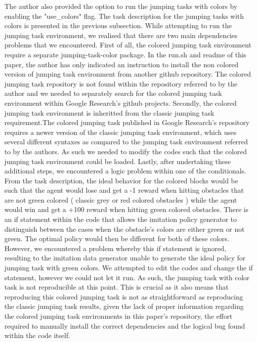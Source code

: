 \documentclass{usiinftr}
\begin{document}
The author also provided the option to run the jumping tasks with colors by enabling the "use\_colors" flag. The task description for the jumping tasks with colors is presented in the previous subsection. While attempting to run the jumping task environment, we realised that there are two main dependencies problems that we encountered. First of all, the colored jumping task environment require a separate jumping-task-color package. In the run.sh and readme of this paper, the author has only indicated an instruction to install the non colored version of jumping task environment from another github repository. The colored jumping task repository is not found within the repository referred to by the author and we needed to separately search for the colored jumping task environment within Google Research's github projects. Secondly, the colored jumping task environment is inheritted from the classic jumping task requirement.The colored jumping task published in Google Research's repository requires a newer version of the classic jumping task environment, which uses several different syntaxes as compared to the jumping task environment referred to by the authors. As such we needed to modify the codes such that the colored jumping task environment could be loaded. Lastly, after undertaking these additional steps, we encountered a logic problem within one of the conditionals. From the task description, the ideal behavior for the colored blocks would be such that the agent would lose and get a -1 reward when hitting obstacles that are not green colored ( classic grey or red colored obstacles ) while the agent would win and get a +100 reward when hitting green colored obstacles. There is an if statement within the code that allows the imitation policy generator to distinguish between the cases when the obstacle's colors are either green or not green. The optimal policy would then be different for both of these colors. However, we encountered a problem whereby this if statement is ignored, resulting to the imitation data generator unable to generate the ideal policy for jumping task with green colors. We attempted to edit the codes and change the if statement, however we could not let it run. As such, the jumping task with color task is not reproducible at this point. This is crucial as it also means that reproducing this colored jumping task is not as straightforward as reproducing the classic jumping task results, given the lack of proper information regarding the colored jumping task environments in this paper's repository, the effort required to manually install the correct dependencies and the logical bug found within the code itself. 
\end{document}
